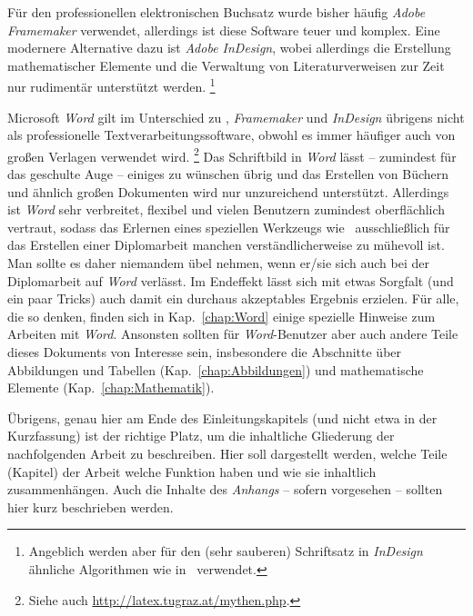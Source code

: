 Für den professionellen elektronischen Buchsatz wurde bisher
häufig \emph{Adobe Framemaker} verwendet, allerdings ist diese
Software teuer und komplex. Eine modernere Alternative dazu ist
\emph{Adobe InDesign}, wobei allerdings die Erstellung
mathematischer Elemente und die Verwaltung von Literaturverweisen
zur Zeit nur rudimentär unterstützt werden.%
\footnote{Angeblich werden aber für den (sehr sauberen) Schriftsatz 
in \emph{InDesign} ähnliche Algorithmen wie in \latex\ verwendet.}

Microsoft \emph{Word} gilt im Unterschied zu \latex, 
\emph{Framemaker} und \emph{InDesign} übrigens nicht als professionelle
Textverarbeitungssoftware, obwohl es immer häufiger auch von
großen Verlagen verwendet wird.%
\footnote{Siehe auch \url{http://latex.tugraz.at/mythen.php}.}
Das Schriftbild in \emph{Word}
lässt -- zumindest für das geschulte Auge -- einiges zu wünschen
übrig und das Erstellen von Büchern und ähnlich großen Dokumenten
wird nur unzureichend unterstützt. Allerdings ist \emph{Word} sehr
verbreitet, flexibel und vielen Benutzern zumindest oberflächlich
vertraut, sodass das Erlernen eines speziellen Werkzeugs wie
\latex\ ausschließlich für das Erstellen einer Diplomarbeit
manchen verständlicherweise zu mühevoll ist. Man sollte es daher
niemandem übel nehmen, wenn er/sie sich auch bei der Diplomarbeit
auf \emph{Word} verlässt. Im Endeffekt lässt sich mit etwas
Sorgfalt (und ein paar Tricks) auch damit ein durchaus akzeptables
Ergebnis erzielen. Für alle, die so denken, finden sich in
Kap.~\ref{chap:Word} einige spezielle Hinweise zum Arbeiten mit
\emph{Word}. Ansonsten sollten für \emph{Word}-Benutzer aber auch
andere Teile dieses Dokuments von Interesse sein, insbesondere die
Abschnitte über Abbildungen und Tabellen
(Kap.~\ref{chap:Abbildungen}) und mathematische Elemente
(Kap.~\ref{chap:Mathematik}).






Übrigens, genau hier am Ende des Einleitungskapitels (und nicht
etwa in der Kurzfassung) ist der richtige Platz, um die
inhaltliche Gliederung der nachfolgenden Arbeit zu beschreiben.
Hier soll dargestellt werden, welche Teile (Kapitel) der Arbeit
welche Funktion haben und wie sie inhaltlich zusammenhängen. Auch
die Inhalte des \emph{Anhangs} -- sofern vorgesehen -- sollten hier
kurz beschrieben werden.

